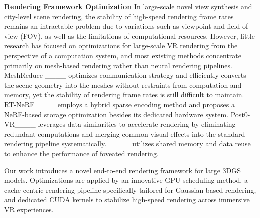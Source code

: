 \textbf{Rendering Framework Optimization} In large-scale novel view synthesis and city-level scene rendering, the stability of high-speed rendering frame rates remains an intractable problem due to variations such as viewpoint and field of view (FOV), as well as the limitations of computational resources. However, little research has focused on optimizations for large-scale VR rendering from the perspective of a computation system, and most existing methods concentrate primarily on mesh-based rendering rather than neural rendering pipelines. MeshReduce ____ optimizes communication strategy and efficiently converts the scene geometry into the meshes without restraints from computation and memory, yet the stability of rendering frame rates is still difficult to maintain. RT-NeRF____ employs a hybrid sparse encoding method and proposes a NeRF-based storage optimization besides its dedicated hardware system. Post0-VR____ leverages data similarities to accelerate rendering by eliminating redundant computations and merging common visual effects into the standard rendering pipeline systematically. ____ utilizes shared memory and data reuse to enhance the performance of foveated rendering. 

Our work introduces a novel end-to-end rendering framework for large 3DGS models. Optimizations are applied by an innovative GPU scheduling method, a cache-centric rendering pipeline specifically tailored for Gaussian-based rendering, and dedicated CUDA kernels to stabilize high-speed rendering across immersive VR experiences.

